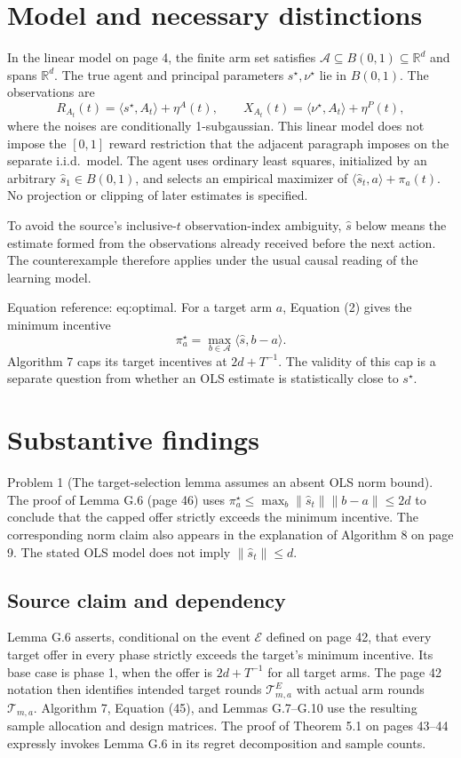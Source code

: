 \documentclass[10pt]{article}
\begin{document}
\section*{Model and necessary distinctions}
In the linear model on page 4, the finite arm set satisfies \(\mathcal A\subseteq B(0,1)\subseteq\mathbb R^d\) and spans \(\mathbb R^d\). The true agent and principal parameters \(s^\star,\nu^\star\) lie in \(B(0,1)\). The observations are \[R_{A_t}(t)=\langle s^\star,A_t\rangle+\eta^A(t),\qquad
 X_{A_t}(t)=\langle\nu^\star,A_t\rangle+\eta^P(t),\] where the noises are conditionally 1-subgaussian. This linear model does not impose the \([0,1]\) reward restriction that the adjacent paragraph imposes on the separate i.i.d. model. The agent uses ordinary least squares, initialized by an arbitrary \(\widehat s_1\in B(0,1)\), and selects an empirical maximizer of \(\langle\widehat s_t,a\rangle+\pi_a(t)\). No projection or clipping of later estimates is specified.\par
To avoid the source’s inclusive-\(t\) observation-index ambiguity, \(\widehat s\) below means the estimate formed from the observations already received before the next action. The counterexample therefore applies under the usual causal reading of the learning model.\par
Equation reference: eq:optimal. For a target arm \(a\), Equation (2) gives the minimum incentive \[
 \pi_a^\star=\max_{b\in\mathcal A}
          \langle\widehat s,b-a\rangle.\] Algorithm 7 caps its target incentives at \(2d+T^{-1}\). The validity of this cap is a separate question from whether an OLS estimate is statistically close to \(s^\star\).\par
\section*{Substantive findings}
Problem 1 (The target-selection lemma assumes an absent OLS norm bound).  The proof of Lemma G.6 (page 46) uses \(\pi_a^\star\leq\max_b\|\widehat s_t\|\|b-a\|\leq 2d\) to conclude that the capped offer strictly exceeds the minimum incentive. The corresponding norm claim also appears in the explanation of Algorithm 8 on page 9. The stated OLS model does not imply \(\|\widehat s_t\|\leq d\).\par
\subsection*{Source claim and dependency}
Lemma G.6 asserts, conditional on the event \(\mathcal E\) defined on page 42, that every target offer in every phase strictly exceeds the target’s minimum incentive. Its base case is phase 1, when the offer is \(2d+T^{-1}\) for all target arms. The page 42 notation then identifies intended target rounds \(\mathcal T^E_{m,a}\) with actual arm rounds \(\mathcal T_{m,a}\). Algorithm 7, Equation (45), and Lemmas G.7–G.10 use the resulting sample allocation and design matrices. The proof of Theorem 5.1 on pages 43–44 expressly invokes Lemma G.6 in its regret decomposition and sample counts.\par
\end{document}
